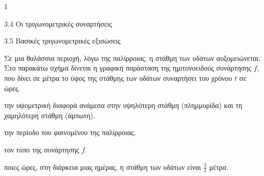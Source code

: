\begin{ylh}{1}
\item 3.4 Οι τριγωνομετρικές συναρτήσεις
\item 3.5 Βασικές τριγωνομετρικές εξισώσεις
\end{ylh}
Σε μια θαλάσσια περιοχή, λόγω της παλίρροιας, η στάθμη των υδάτων αυξομειώνεται. Στο παρακάτω σχήμα δίνεται η γραφική παράσταση της ημιτονοειδούς συνάρτησης $f$, που δίνει σε μέτρα το ύψος της στάθμης των υδάτων συναρτήσει του χρόνου $t$ σε ώρες.
\begin{center}
\end{center}
\begin{alist}
\item την υψομετρική διαφορά ανάμεσα στην υψηλότερη στάθμη (πλημμυρίδα) και τη χαμηλότερη στάθμη (άμπωτη).
\item την περίοδο του φαινομένου της παλίρροιας.
\item τον τύπο της συνάρτησης $f$.
\item ποιες ώρες, στη διάρκεια μιας ημέρας, η στάθμη των υδάτων είναι $\frac{3}{2}$ μέτρα.
\end{alist}

